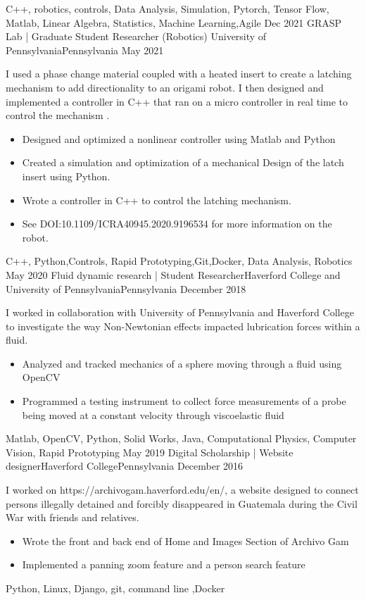 \begin{experiences}
{\begin{itemize}
 			\end{itemize} 
                 }
                {C++, robotics, controls, Data Analysis, Simulation, Pytorch, Tensor Flow, Matlab, Linear Algebra, Statistics, Machine Learning,Agile}   
 \experience
    {Dec 2021}     {GRASP Lab | Graduate Student Researcher (Robotics)  }{ University of Pennsylvania}{Pennsylvania}
    {May 2021}    {
 I used a phase change material coupled with a heated insert to create a latching mechanism to add directionality to an origami robot. I then designed and implemented a controller in C++ that ran on a micro controller in real time to control the mechanism .
                      \begin{itemize}
			\item Designed and optimized a nonlinear controller using Matlab and Python 
			\item Created a simulation and optimization of a mechanical Design  of the latch insert using Python.
			\item Wrote a controller in C++ to control the latching mechanism.
			\item  See DOI:10.1109/ICRA40945.2020.9196534 for more information on the robot.
                      \end{itemize}
                    }
                    {C++, Python,Controls, Rapid Prototyping,Git,Docker, Data Analysis, Robotics}
  \experience
    {May 2020}   {Fluid dynamic research | Student Researcher}{Haverford College and University of Pennsylvania}{Pennsylvania}
    {December 2018} {
  I worked in collaboration with University of Pennsylvania and Haverford College to investigate the way Non-Newtonian effects impacted lubrication forces within a fluid.
                      \begin{itemize}
                        \item Analyzed and tracked mechanics of a sphere moving through a fluid using OpenCV 
                        \item Programmed a testing instrument to collect force measurements of a probe being moved at a constant velocity through viscoelastic fluid
                      \end{itemize}
                    }
                    {Matlab, OpenCV, Python, Solid Works, Java, Computational Physics, Computer Vision, Rapid Prototyping}
  \experience
    {May 2019}   {Digital Scholarship | Website designer}{Haverford College}{Pennsylvania}
    {December 2016} {
    I worked on https://archivogam.haverford.edu/en/, a website designed to connect persons illegally detained and forcibly disappeared in Guatemala during the Civil War with friends and relatives.
                      \begin{itemize}
                       \item Wrote the front and back end of Home and Images Section of Archivo Gam 
		     \item Implemented a panning zoom feature and a person search feature
                      \end{itemize}
                    }
                    {Python, Linux, Django, git, command line ,Docker}

 
 

\end{experiences}
